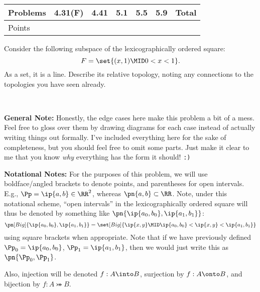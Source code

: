 \documentclass{fkpset}
\newenvironment{why}{\begin{adjustwidth}{0.01\linewidth}{0.05\linewidth}~}%
  {\end{adjustwidth}}
\begin{document}
\pagestyle{plain}
\pagestyle{fancy}
  \vspace{-3cm}
  \begin{table}[H]
    \centering
    \begin{tabular}{@{}lcccccr@{}}\toprule
      Problems & 4.31(F) & 4.41 & 5.1 & 5.5 & 5.9 & Total \\ \midrule
      Points   &         &      &     &     &     &       \\ \bottomrule
    \end{tabular}
  \end{table}
  \vspace{1cm}

  \begin{problem}[4.31(F)]
    Consider the following subspace of the lexicographically ordered
    square:
    \[
      F = \set{(x,1) \MID 0 < x < 1}.
    \]
    As a set, it is a line. Describe its relative topology, noting any
    connections to the topologies you have seen already.
  \end{problem}
  \begin{why}
    \small
    \begin{leftbar}
      \textbf{General Note:} Honestly, the edge cases here make this
      problem a bit of a mess. Feel free to gloss over them by drawing
      diagrams for each case instead of actually writing things out
      formally. I've included everything here for the sake of
      completeness, but you should feel free to omit some parts. Just
      make it clear to me that you know \emph{why} everything has the
      form it should! \texttt{:)}
    \end{leftbar}
    \begin{leftbar}
      \textbf{Notational Notes:} For the purposes of this problem, we
      will use boldface/angled brackets to denote points, and
      parentheses for open intervals. E.g., $\Pp = \ip{a,b} \in
      \RR^2$, whereas $\pn{a,b} \subset \RR$. Note, under this
      notational scheme, ``open intervals'' in the lexicographically
      ordered square will thus be denoted by something like
      $\pn{\ip{a_0, b_0}, \ip{a_1, b_1}}$:
      \[
        \pn[Big]{\ip{a_0, b_0}, \ip{a_1, b_1}} =
        \set[Big]{\ip{x,y} \MID \ip{a_0, b_0} < \ip{x,y} < \ip{a_1,
            b_1}}
      \]
      using square brackets when appropriate. Note that if we have
      previously defined $\Pp_0 = \ip{a_0, b_0}$, $\Pp_1 = \ip{a_1,
        b_1}$, then we would just write this as $\pn{\Pp_0, \Pp_1}$.

      Also, injection will be denoted $f : A \into B$, surjection by
      $f : A \onto B$, and bijection by $f : A \bij B$.
    \end{leftbar}
  \end{why}
\end{document}

